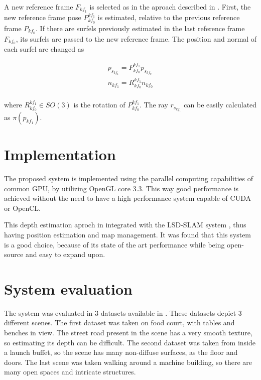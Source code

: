 \documentclass[1p]{elsarticle}
\begin{document}
A new reference frame $F_{kf_{1}}$ is selected as in the aproach described in \cite{Engel_et_al_2014}. First, the new reference frame pose $P_{kf_{0}}^{kf_{1}}$ is estimated, relative to the previous reference frame $P_{kf_{0}}$. If there are surfels previously estimated in the last reference frame $F_{kf_{0}}$, its surfels are passed to the new reference frame. The position and normal of each surfel are changed as

\begin{equation}
\begin{gathered}
    p_{s_{kf_1}} = P_{kf_{0}}^{kf_{1}} p_{s_{kf_0}}\\
	n_{kf_{1}} = R_{kf_{0}}^{kf_{1}} n_{kf_{0}}\\
	\label{equ:surfel_reprojection}
\end{gathered}
\end{equation}

where $R_{kf_{0}}^{kf_{1}} \in SO(3)$ is the rotation of $P_{kf_{0}}^{kf_{1}}$. The ray $r_{s_{kf_{1}}}$ can be easily calculated as $\pi(p_{kf_{1}})$. 

\section{Implementation}

The proposed system is implemented using the parallel computing capabilities of common GPU, by utilizing OpenGL core 3.3. This way good performance is achieved without the need to have a high performance system capable of CUDA or OpenCL.

This depth estimation aproch in integrated with the LSD-SLAM system \cite{Engel_et_al_2014}, thus having position estimation and map management. It was found that this system is a good choice, because of its state of the art performance while being open-source and easy to expand upon.

\section{System evaluation}

The system was evaluated in 3 datasets available in \cite{tum_lsd_slam_datasets}. These datasets depict 3 different scenes. The first dataset was taken on food court, with tables and benches in view. The street road present in the scene has a very smooth texture, so estimating its depth can be difficult. The second dataset was taken from inside a launch buffet, so the scene has many non-diffuse surfaces, as the floor and doors. The last scene was taken walking around a machine building, so there are many open spaces and intricate structures.
\end{document}
